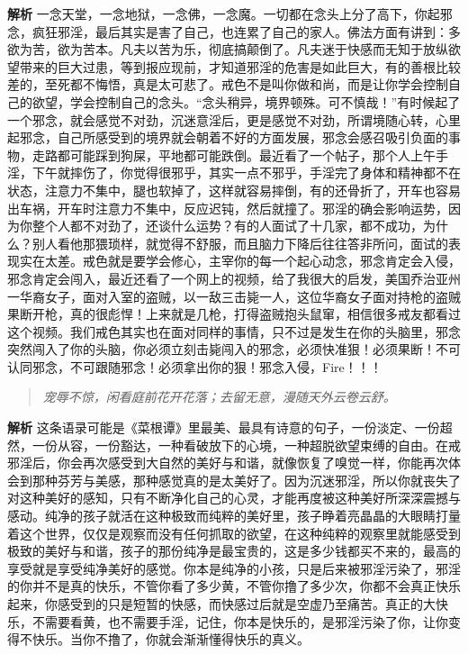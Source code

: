 \textbf{解析} 一念天堂，一念地狱，一念佛，一念魔。一切都在念头上分了高下，你起邪念，疯狂邪淫，最后其实是害了自己，也连累了自己的家人。佛法方面有讲到：多欲为苦，欲为苦本。凡夫以苦为乐，彻底搞颠倒了。凡夫迷于快感而无知于放纵欲望带来的巨大过患，等到报应现前，才知道邪淫的危害是如此巨大，有的善根比较差的，至死都不悔悟，真是太可悲了。戒色不是叫你做和尚，而是让你学会控制自己的欲望，学会控制自己的念头。“念头稍异，境界顿殊。可不慎哉！”有时候起了一个邪念，就会感觉不对劲，沉迷意淫后，更是感觉不对劲，所谓境随心转，心里起邪念，自己所感受到的境界就会朝着不好的方面发展，邪念会感召吸引负面的事物，走路都可能踩到狗屎，平地都可能跌倒。最近看了一个帖子，那个人上午手淫，下午就摔伤了，你觉得很邪乎，其实一点不邪乎，手淫完了身体和精神都不在状态，注意力不集中，腿也软掉了，这样就容易摔倒，有的还骨折了，开车也容易出车祸，开车时注意力不集中，反应迟钝，然后就撞了。邪淫的确会影响运势，因为你整个人都不对劲了，还谈什么运势？有的人面试了十几家，都不成功，为什么？别人看他那猥琐样，就觉得不舒服，而且脑力下降后往往答非所问，面试的表现实在太差。戒色就是要学会修心，主宰你的每一个起心动念，邪念肯定会入侵，邪念肯定会闯入，最近还看了一个网上的视频，给了我很大的启发，美国乔治亚州一华裔女子，面对入室的盗贼，以一敌三击毙一人，这位华裔女子面对持枪的盗贼果断开枪，真的很彪悍！上来就是几枪，打得盗贼抱头鼠窜，相信很多戒友都看过这个视频。我们戒色其实也在面对同样的事情，只不过是发生在你的头脑里，邪念突然闯入了你的头脑，你必须立刻击毙闯入的邪念，必须快准狠！必须果断！不可认同邪念，不可跟随邪念！必须拿出你的狠！邪念入侵，Fire！！！

\begin{quote}\it
    宠辱不惊，闲看庭前花开花落；去留无意，漫随天外云卷云舒。
\end{quote}

\textbf{解析} 这条语录可能是《菜根谭》里最美、最具有诗意的句子，一份淡定、一份超然，一份从容，一份豁达，一种看破放下的心境，一种超脱欲望束缚的自由。在戒邪淫后，你会再次感受到大自然的美好与和谐，就像恢复了嗅觉一样，你能再次体会到那种芬芳与美感，那种感觉真的是太美好了。因为沉迷邪淫，所以你就丧失了对这种美好的感知，只有不断净化自己的心灵，才能再度被这种美好所深深震撼与感动。纯净的孩子就活在这种极致而纯粹的美好里，孩子睁着亮晶晶的大眼睛打量着这个世界，仅仅是观察而没有任何抓取的欲望，在这种纯粹的观察里就能感受到极致的美好与和谐，孩子的那份纯净是最宝贵的，这是多少钱都买不来的，最高的享受就是享受纯净美好的感觉。你本是纯净的小孩，只是后来被邪淫污染了，邪淫的你并不是真的快乐，不管你看了多少黄，不管你撸了多少次，你都不会真正快乐起来，你感受到的只是短暂的快感，而快感过后就是空虚乃至痛苦。真正的大快乐，不需要看黄，也不需要手淫，记住，你本是快乐的，是邪淫污染了你，让你变得不快乐。当你不撸了，你就会渐渐懂得快乐的真义。

